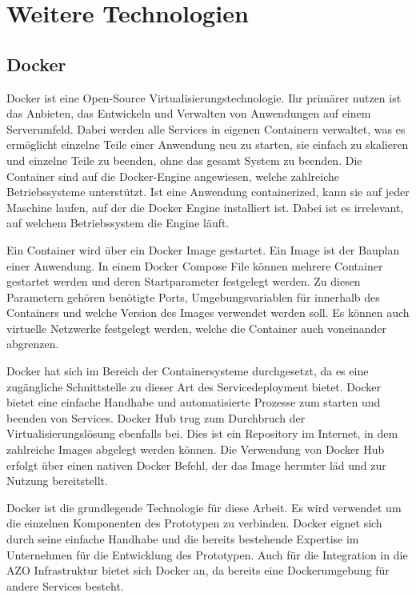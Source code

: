 \documentclass[a4paper, 12pt, oneside, toc=listofnumbered, bibliography=totoc]{scrbook}
\begin{document}
	\section{Weitere Technologien}
		\subsection{Docker}
		
		Docker ist eine Open-Source Virtualisierungstechnologie. Ihr primärer nutzen ist das Anbieten, das Entwickeln und Verwalten von Anwendungen auf einem Serverumfeld. Dabei werden alle Services in eigenen Containern verwaltet, was es ermöglicht einzelne Teile einer Anwendung neu zu starten, sie einfach zu skalieren und einzelne Teile zu beenden, ohne das gesamt System zu beenden. Die Container sind auf die Docker-Engine angewiesen, welche zahlreiche Betriebssysteme unterstützt. Ist eine Anwendung containerized, kann sie auf jeder Maschine laufen, auf der die Docker Engine installiert ist. Dabei ist es irrelevant, auf welchem Betriebssystem die Engine läuft. \cite{noauthor_install_2023}
		
		Ein Container wird über ein Docker Image gestartet. Ein Image ist der Bauplan einer Anwendung. In einem Docker Compose File können mehrere Container gestartet werden und deren Startparameter festgelegt werden. Zu diesen Parametern gehören benötigte Ports, Umgebungsvariablen für innerhalb des Containers und welche Version des Images verwendet werden soll. Es können auch virtuelle Netzwerke festgelegt werden, welche die Container auch voneinander abgrenzen. 
		
		Docker hat sich im Bereich der Containersysteme durchgesetzt, da es eine zugängliche Schnittstelle zu dieser Art des Servicedeployment bietet. Docker bietet eine einfache Handhabe und automatisierte Prozesse zum starten und beenden von Services. Docker Hub trug zum Durchbruch der Virtualisierungslösung ebenfalls bei. Dies ist ein Repository im Internet, in dem zahlreiche Images abgelegt werden können. Die Verwendung von Docker Hub erfolgt über einen nativen Docker Befehl, der das Image herunter läd und zur Nutzung bereitstellt. 
		
		Docker ist die grundlegende Technologie für diese Arbeit. Es wird verwendet um die einzelnen Komponenten des Prototypen zu verbinden. Docker eignet sich durch seine einfache Handhabe und die bereits bestehende Expertise im Unternehmen für die Entwicklung des Prototypen. Auch für die Integration in die AZO Infrastruktur bietet sich Docker an, da bereits eine Dockerumgebung für andere Services besteht. 
		
\end{document}
